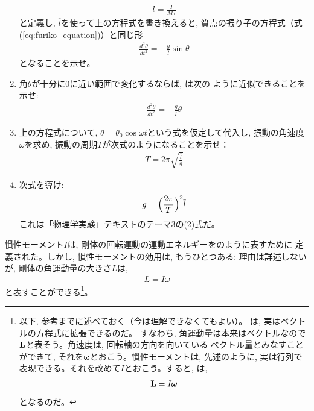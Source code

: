 \begin{q}
\begin{q}
\begin{enumerate}
\begin{eqnarray}
\overline{l}=\frac{I}{M\,l}\label{q:mominert_pandulum6}
\end{eqnarray}
と定義し, $\overline{l}$を使って上の方程式を書き換えると, 質点の振り子の方程式（式(\ref{eq:furiko_equation})）と同じ形
\begin{eqnarray}
\frac{d^2\theta}{dt^2}=-\frac{g}{\overline{l}}\sin\theta\label{q:mominert_pandulum7}
\end{eqnarray}
となることを示せ。
\item 角$\theta$が十分に0に近い範囲で変化するならば, は次の
ように近似できることを示せ:
\begin{eqnarray}
\frac{d^2\theta}{dt^2}=-\frac{g}{\overline{l}}\theta\label{q:mominert_pandulum8}
\end{eqnarray}
\item 上の方程式について, $\theta=\theta_0 \cos \omega t$という式を仮定して代入し, 
振動の角速度$\omega$を求め, 振動の周期$T$が次式のようになることを示せ：
\begin{eqnarray}
T=2\pi\sqrt{\frac{\overline{l}}{g}}\label{q:mominert_pandulum9}
\end{eqnarray}
\item 次式を導け:
\begin{eqnarray}g=\Bigl(\frac{2\pi}{T}\Bigr)^2\overline{l}\end{eqnarray}
これは「物理学実験」テキストのテーマ3の(2)式だ。
\end{enumerate}
\end{q}
\vspace{0.5cm}

慣性モーメント$I$は, 剛体の回転運動の運動エネルギーをのように表すために
定義された。しかし, 慣性モーメントの効用は, もうひとつある: 理由は詳述しないが, 
剛体の角運動量の大きさ$L$は, 
\begin{eqnarray}
L=I\omega\label{eq:mominert_angmom}
\end{eqnarray}
と表すことができる\footnote{以下, 参考までに述べておく（今は理解できなくてもよい）。
は, 実はベクトルの方程式に拡張できるのだ。
すなわち, 角運動量は本来はベクトルなので${\bf L}$と表そう。角速度は, 回転軸の方向を向いている
ベクトル量とみなすことができて, それを$\pmb{\omega}$とおこう。慣性モーメントは, 先述のように, 
実は行列で表現できる。それを改めて$I$とおこう。すると, は, 
\begin{eqnarray}
{\bf L}=I\pmb{\omega}\label{eq:mominert_angmom_vect}
\end{eqnarray}
\mv
となるのだ。}。\mv


\end{q}
